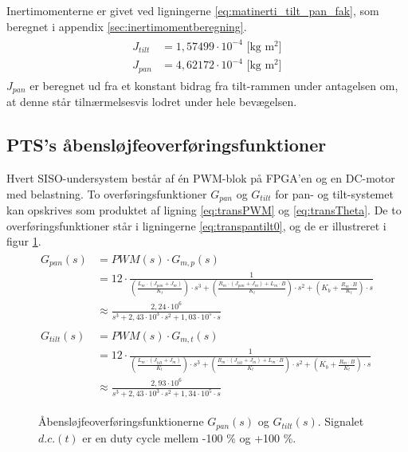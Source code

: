 Inertimomenterne er givet ved ligningerne \ref{eq:matinerti_tilt_pan_fak},
som beregnet i appendix \ref{sec:inertimomentberegning}.
\begin{align}
\label{eq:matinerti_tilt_pan_fak}
\begin{split}
{J_{tilt}}&=1,57499\cdot{10}^{-4} \text{ [kg m$^2$]}
\\
{J_{pan}}&=4,62172\cdot{10}^{-4} \text{ [kg m$^2$]}
\end{split}
\end{align}
\(J_{pan}\) er beregnet ud fra et konstant bidrag fra tilt-rammen under antagelsen om,
at denne står tilnærmelsesvis lodret under hele bevægelsen.

\subsection{PTS's åbensløjfeoverføringsfunktioner}
Hvert SISO-undersystem består af én PWM-blok på FPGA'en og en DC-motor med belastning.
To overføringsfunktioner \(G_{pan}\) og \(G_{tilt}\) for pan- og tilt-systemet kan opskrives
som produktet af ligning \ref{eq:transPWM} og \ref{eq:transTheta}. De to overføringsfunktioner
står i ligningerne \ref{eq:transpantilt0}, og de er illustreret i figur \ref{fig:openloop1}.
\begin{align}
\label{eq:transpantilt0}
\begin{split}
	G_{pan}\left(s\right)&=PWM\left(s\right)\cdot{}G_{m,p}\left(s\right)\\
	&=12\cdot{}\frac{1}
			{\left(\frac{L_m\cdot{}\left(J_{pan}+J_m\right)}{K_t}\right)\cdot{}s^3
			+\left(\frac{R_m\cdot{}\left(J_{pan}+J_m\right)+L_m\cdot{}B}{K_t}\right)\cdot{}s^2
			+\left(K_b+\frac{R_m\cdot{}B}{K_t}\right)\cdot{}s}\\
	&\approx\frac{2,24\cdot{}10^6}{s^3 + 2,43\cdot{}10^3 \cdot{} s^2 + 1,03\cdot{}10^5\cdot{}s}
	\\
	\\
	G_{tilt}\left(s\right)&=PWM\left(s\right)\cdot{}G_{m,t}\left(s\right)\\
	&=12\cdot{}\frac{1}
			{\left(\frac{L_m\cdot{}\left(J_{tilt}+J_m\right)}{K_t}\right)\cdot{}s^3
			+\left(\frac{R_m\cdot{}\left(J_{tilt}+J_m\right)+L_m\cdot{}B}{K_t}\right)\cdot{}s^2
			+\left(K_b+\frac{R_m\cdot{}B}{K_t}\right)\cdot{}s}\\
	&\approx\frac{2,93\cdot{}10^6}{s^3 + 2,43\cdot{}10^3 \cdot{} s^2 + 1,34\cdot{}10^5\cdot{}s}
\end{split}
\end{align}
\begin{figure}[!th]
\centering
\begin{tikzpicture}[auto, node distance=2.6cm,>=latex']

\end{tikzpicture}
\caption[Åbensløjfeoverføringsfunktioner]{Åbensløjfeoverføringsfunktionerne \(G_{pan}\left(s\right)\) og \(G_{tilt}\left(s\right)\).
	Signalet \(d.c.\left(t\right)\) er en duty cycle mellem -100 \% og +100 \%.}
\label{fig:openloop1}
\end{figure}

